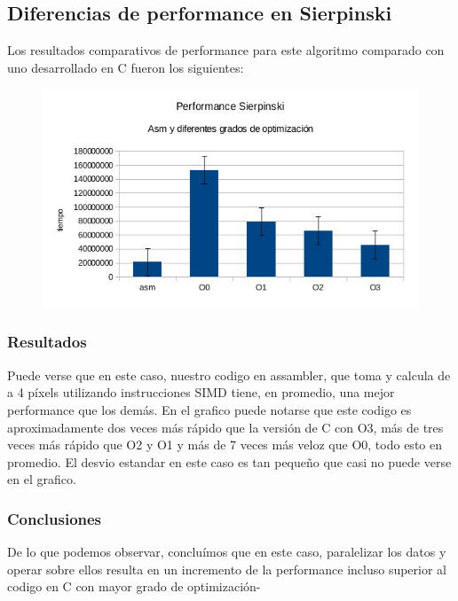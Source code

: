 \documentclass[a4paper]{article}
\begin{document}
\subsection{Diferencias de performance en Sierpinski}

Los resultados comparativos de performance para este algoritmo comparado con uno desarrollado en C fueron los siguientes:

\newpage

\begin{figure}[h!]
  \begin{center}
  \includegraphics[scale=0.66]{Graficos1.4/sie/per.jpg}
  \label{nombreparareferenciar7}
  \end{center}
\end{figure}

\subsubsection{Resultados}
Puede verse que en este caso, nuestro codigo en assambler, que toma y calcula de a 4 píxels utilizando instrucciones SIMD tiene, en promedio, una mejor performance que los demás. En el grafico puede notarse que este codigo es aproximadamente dos veces más rápido que la versión de C con O3, más de tres veces más rápido que O2 y O1 y más de 7 veces más veloz que O0, todo esto en promedio. El desvio estandar en este caso es tan pequeño que casi no puede verse en el grafico.
\subsubsection{Conclusiones}

De lo que podemos observar, concluímos que en este caso, paralelizar los datos y operar sobre ellos resulta en un incremento de la performance incluso superior al codigo en C con mayor grado de optimización-
\end{document}
